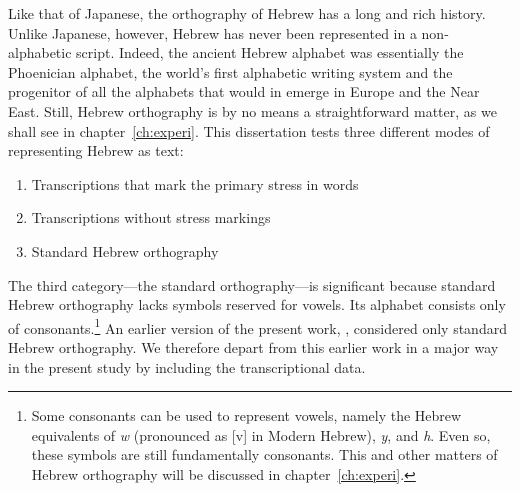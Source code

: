 Like that of Japanese, the orthography of Hebrew has a long and rich history. Unlike Japanese, however, Hebrew has never been represented in a non-alphabetic script. Indeed, the ancient Hebrew alphabet was essentially the Phoenician alphabet, the world's first alphabetic writing system and the progenitor of all the alphabets that would in emerge in Europe and the Near East. Still, Hebrew orthography is by no means a straightforward matter, as we shall see in chapter~\ref{ch:experi}.
This dissertation tests three different modes of representing Hebrew as text:
\begin{enumerate}
\item Transcriptions that mark the primary stress in words
\item Transcriptions without stress markings 
\item Standard Hebrew orthography 
\end{enumerate} 
The third category---the standard orthography---is significant because standard Hebrew 
orthography lacks symbols reserved for vowels. Its alphabet consists only of consonants.\footnote{Some 
consonants can be used to represent vowels, namely the Hebrew equivalents of \textit{w} 
(pronounced as [v] in Modern Hebrew), \textit{y}, and \textit{h}. Even so, these symbols 
are still fundamentally consonants. This and other matters of Hebrew orthography 
will be discussed in chapter~\ref{ch:experi}.} An earlier version of the present work, 
\citet{meyer-and-dickinson:2016}, considered only standard Hebrew orthography. 
We therefore depart from this earlier work in a major way in the present study by including the transcriptional data. 

